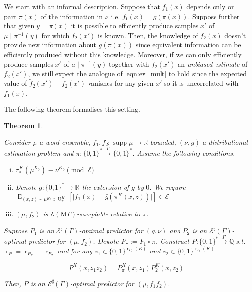\documentclass{article}
\numberwithin{equation}{section}
\theoremstyle{definition}
\theoremstyle{plain}
\newtheorem{theorem}{Theorem}[section]
\newcommand{\Bool}{\{0,1\}}
\newcommand{\Words}{{\Bool^*}}
\newcommand{\WordsLen}[1]{{\Bool^{#1}}}
\DeclareMathOperator{\Supp}{supp}
\DeclareMathOperator{\E}{E}
\DeclareMathOperator{\R}{r}
\DeclareMathOperator{\Un}{U}
\newcommand{\Rats}{\mathbb{Q}}
\newcommand{\Reals}{\mathbb{R}}
\newcommand{\Abs}[1]{\lvert #1 \rvert}
\newcommand{\MGrow}{\mathrm{M}\Gamma}
\newcommand{\Fall}{\mathcal{E}}
\newcommand{\ESG}{\Fall^\sharp(\Gamma)}
\newcommand{\EMG}{\Fall(\MGrow)}
\newcommand{\Scheme}{\xrightarrow{\Gamma}}
\begin{document}
We start with an informal description. Suppose that $f_1(x)$ depends only on part $\pi(x)$ of the information in $x$ i.e. $f_1(x) = g(\pi(x))$. Suppose further that given $y=\pi(x)$ it is possible to efficiently produce samples $x'$ of $\mu \mid \pi^{-1}(y)$ for which $f_2(x')$ is known. Then, the knowledge of $f_2(x)$ doesn't provide new information about $g(\pi(x))$ since equivalent information can be efficiently produced without this knowledge.
 Moreover, if we can only efficiently produce samples $x'$ of $\mu \mid \pi^{-1}(y)$ together with $\tilde{f}_2(x')$ an \emph{unbiased estimate} of $f_2(x')$, we still expect the analogue of \ref{eqn:ev_mult} to hold since the expected value of $\tilde{f}_2(x') - f_2(x')$ vanishes for any given $x'$ so it is uncorrelated with $f_1(x)$.
 
The following theorem formalises this setting.

\begin{samepage}
\begin{theorem}
\label{thm:mult}

Consider $\mu$ a word ensemble, $f_1, f_2: \Supp \mu \rightarrow \Reals$ bounded, $(\nu,g)$ a distributional estimation problem and $\pi: \Words \Scheme \Words$. Assume the following conditions:

\begin{enumerate}[(i)]

\item\label{con:thm__mult__dist} $\pi_*^{K}(\mu^{K_0}) \equiv \nu^{K_0} \pmod \Fall$

\item\label{con:thm__mult__fun} Denote ${\bar{g}: \Words \rightarrow \Reals}$ the extension of $g$ by $0$.  We require ${\E_{(x,z) \sim \mu^{K_0} \times \Un_\pi^{K}}[\Abs{f_1(x)-\bar{g}(\pi^{K}(x,z))}] \in \Fall}$

\item\label{con:thm__mult__smp} $(\mu, f_2)$ is $\EMG$-samplable relative to $\pi$.

\end{enumerate}

Suppose $P_1$ is an $\ESG$-optimal predictor for $(g,\nu)$ and $P_2$ is an $\ESG$-optimal predictor for $(\mu,f_2)$. Denote $P_\pi := P_1 \circ \pi$. Construct ${P: \Words \Scheme \Rats}$ s.t. $\R_P=\R_{P_\pi}+\R_{P_2}$ and for any $z_1 \in \WordsLen{\R_{P_\pi}(K)}$ and $z_2 \in \WordsLen{\R_{P_2}(K)}$

\begin{equation}
P^{K}(x,z_1 z_2)=P_\pi^{K}(x,z_1) P_2^{K}(x,z_2)
\end{equation}

Then, $P$ is an $\ESG$-optimal predictor for $(\mu,f_1 f_2)$.

\end{theorem}
\end{samepage}
\end{document}
